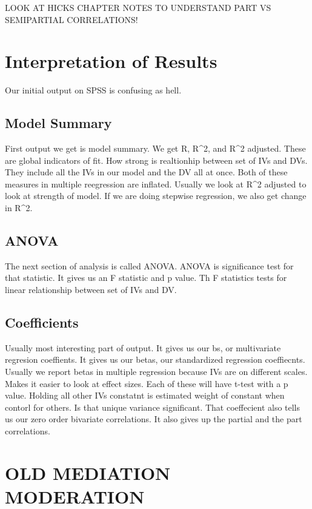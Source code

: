 \documentclass[]{book}
\theoremstyle{definition}
\theoremstyle{definition}
\theoremstyle{definition}
\theoremstyle{remark}
\begin{document}
LOOK AT HICKS CHAPTER NOTES TO UNDERSTAND PART VS SEMIPARTIAL
CORRELATIONS!

\section{Interpretation of Results}\label{interpretation-of-results}

Our initial output on SPSS is confusing as hell.

\subsection{Model Summary}\label{model-summary}

First output we get is model summary. We get R, R\^{}2, and R\^{}2
adjusted. These are global indicators of fit. How strong is realtionhip
between set of IVs and DVs. They include all the IVs in our model and
the DV all at once. Both of these measures in multiple reegression are
inflated. Usually we look at R\^{}2 adjusted to look at strength of
model. If we are doing stepwise regression, we also get change in
R\^{}2.

\subsection{ANOVA}\label{anova}

The next section of analysis is called ANOVA. ANOVA is significance test
for that statistic. It gives us an F statistic and p value. Th F
statistics tests for linear relationship between set of IVs and DV.

\subsection{Coefficients}\label{coefficients}

Usually most interesting part of output. It gives us our bs, or
multivariate regresion coeffients. It gives us our betas, our
standardized regression coeffiecnts. Usually we report betas in multiple
regression because IVs are on different scales. Makes it easier to look
at effect sizes. Each of these will have t-test with a p value. Holding
all other IVs constatnt is estimated weight of constant when contorl for
others. Is that unique variance significant. That coeffecient also tells
us our zero order bivariate correlations. It also gives up the partial
and the part correlations.

\section{OLD MEDIATION MODERATION}\label{old-mediation-moderation}
\end{document}
